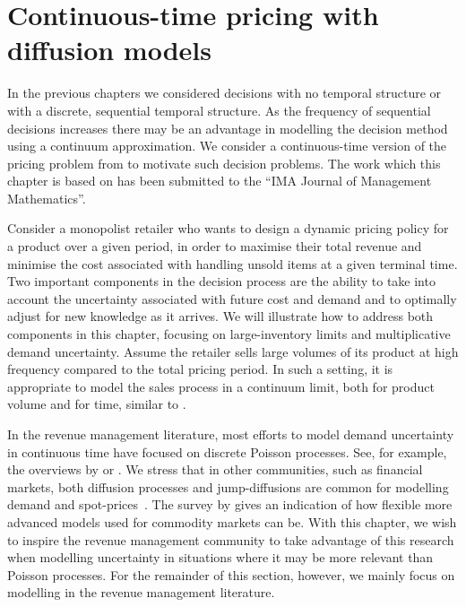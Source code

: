 \documentclass[main.tex]{subfiles}
\begin{document}
\chapter{Continuous-time pricing with diffusion
  models}\label{ch:cts_control}

In the previous chapters we considered decisions with no temporal
structure or with a discrete, sequential temporal structure.
As the frequency of sequential decisions increases there may be an
advantage in modelling the decision method using a continuum
approximation.
We consider a continuous-time version of the pricing problem from
 to motivate such decision problems.
The work which this chapter is based on has been submitted to
the ``IMA Journal of Management Mathematics''.

Consider a monopolist retailer who wants to design a dynamic pricing policy
for a product over a given period, in order to maximise their total
revenue and minimise the cost associated with handling unsold items
at a given terminal time.
Two important components in the decision process are the ability to
take into account the uncertainty associated with future cost and demand and to
optimally adjust for new knowledge as it arrives.
We will illustrate how to address both components in this chapter,
focusing on large-inventory limits and multiplicative demand
uncertainty.
Assume the retailer sells large volumes of its product at
high frequency compared to the total pricing period. In such a setting, it is
appropriate to model the sales process in a continuum limit, both for
product volume and for time, similar to \citet{kalish1983monopolist}.

In the revenue management literature, most efforts to model demand uncertainty in
continuous time have focused on discrete Poisson
processes. See, for example, the overviews by \citet{bitran2003overview}
or \citet{aviv2012dynamic}.
We stress that in other communities, such as financial markets,
both diffusion processes and jump-diffusions are common for modelling
demand and spot-prices~\citep{benth2014stochastic}. The survey by \citet{carmona2014survey}
gives an indication of how flexible more advanced models used for commodity
markets can be. With this chapter, we wish to inspire the revenue
management community to take advantage of this research when modelling
uncertainty in situations where it may be more relevant than Poisson
processes. For the remainder of this section,
however, we mainly focus on modelling in the revenue management literature.
\end{document}

